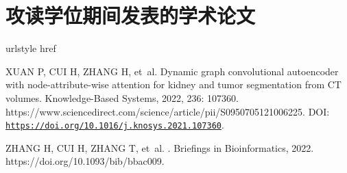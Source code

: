 
\section*{攻读学位期间发表的学术论文}

\renewcommand\refname{}
\begin{thebibliography}{2}
    \providecommand{\natexlab}[1]{#1}
    \providecommand{\url}[1]{#1}
    \expandafter\ifx\csname urlstyle\endcsname\relax\else
      \fi
    \expandafter\ifx\csname href\endcsname\relax
      \DeclareUrlCommand{}
      \def\eprint#1#2{#2}
    \else
      \def\doi#1{\href{https://doi.org/#1}{\nolinkurl{#1}}}
      \let\eprint\href
    \fi
    
    XUAN P, CUI H, ZHANG H, et~al.
    \newblock Dynamic graph convolutional autoencoder with node-attribute-wise
      attention for kidney and tumor segmentation from {CT}
      volumes\allowbreak[J/OL].
    \newblock Knowledge-Based Systems, 2022, 236: 107360.
    \newblock
      \url{https://www.sciencedirect.com/science/article/pii/S0950705121006225}.
    \newblock DOI: \doi{https://doi.org/10.1016/j.knosys.2021.107360}.
    
    ZHANG H, CUI H, ZHANG T, et~al.
    \allowbreak[J/OL].
    \newblock Briefings in Bioinformatics, 2022.
    \newblock \url{https://doi.org/10.1093/bib/bbac009}.
    
    \end{thebibliography}